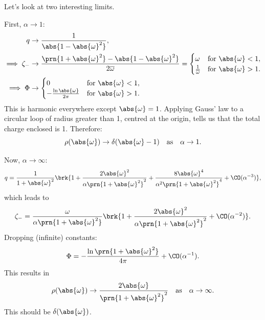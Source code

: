 \documentclass[12pt]{article}
\newcommand{\omb}{\overline{\omega}}
\newcommand{\oa}{\abs{\omega}}
\newcommand{\opo}{\prn{1+\abs{\omega}^2}}
\newcommand{\omoa}{\abs{1-\abs{\omega}^2}}
\begin{document}
Let's look at two interesting limits.

First, $\alpha\to1$:
%
\begin{equation}\label{eq:rszmphiato1}
\begin{aligned}
  q &\to \frac{1}{\omoa},\\
  \implies\zeta_- &\to \frac{\opo-\omoa}{2\omb} =
     \begin{cases}
       \omega &\text{for } \abs{\omega}<1,\\
       \frac{1}{\omb} &\text{for } \abs{\omega}>1.\\
     \end{cases}\\
  \implies\Phi &\to
     \begin{cases}
       0 &\text{for } \abs{\omega}<1,\\
       -\frac{\ln\abs{\omega}}{2\pi} &\text{for } \abs{\omega}>1.\\
     \end{cases}
\end{aligned}
\end{equation}
%
This is harmonic everywhere except $\abs{\omega}=1$.
Applying Gauss' law to a circular loop of radius greater than 1, centred at the origin, tells us that the total charge enclosed is 1.
Therefore:
%
\begin{equation}\label{eq:rhoato1}
  \rho(\oa) \to \delta(\abs{\omega}-1)
  \quad\text{as}\quad \alpha\to1.
\end{equation}
%


Now, $\alpha\to\infty$:
%
\begin{equation}\label{eq:rsatoinfty}
  q =
  \frac{1}{1+\abs{\omega}^2} \brk{1 + \frac{2\abs{\omega}^ 2}{\alpha\opo^2}
       + \frac{8\abs{\omega}^4}{\alpha^2\opo^4}
       + \CO(\alpha^{-3})},
\end{equation}
%
which leads to
%
\begin{equation}\label{eq:zmatoinfty}
  \zeta_- =
  \frac{\omega}{\alpha\opo} \brk{1 + \frac{2\abs{\omega}^2}{\alpha\opo^2} + \CO(\alpha^{-2})}.
\end{equation}
%
Dropping (infinite) constants:
%
\begin{equation}\label{eq:phiatoinfty}
  \Phi = -\frac{\ln\opo}{4\pi} + \CO(\alpha^{-1}).
\end{equation}
%
This results in
%
\begin{equation}\label{eq:rhoatoinfty}
  \rho(\oa) \to \frac{2\oa}{\opo^2}
  \quad\text{as}\quad
  \alpha\to\infty.
\end{equation}
%
This should be $\delta(\oa)$.
\end{document}
